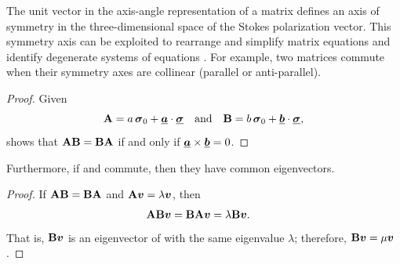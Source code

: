The unit vector in the axis-angle representation of a matrix defines an axis of symmetry in the three-dimensional space of the Stokes polarization vector.
%
This symmetry axis can be exploited to rearrange and simplify matrix equations and identify degenerate systems of equations \citep[as in Appendix B of][and  of this paper]{van04c}.
%
For example, two matrices 
commute when their symmetry axes are collinear (parallel or anti-parallel).
%
\begin{proof}
Given $${\bf A} = a\,\mbox{\boldmath $\sigma$}_{0} + \underline{\mbox{\boldmath $a$}} \cdot \underline{\mbox{\boldmath $\sigma$}} \quad\text{and}\quad
{\bf B} = b\,\mbox{\boldmath $\sigma$}_{0} + \underline{\mbox{\boldmath $b$}} \cdot \underline{\mbox{\boldmath $\sigma$}},$$
  shows that ${\bf A}{\bf B} = {\bf B}{\bf A}$ if and only if $\underline{\mbox{\boldmath $a$}} \times \underline{\mbox{\boldmath $b$}} = 0$.
\end{proof}
%

Furthermore, if  and  commute, then they have common eigenvectors.
\begin{proof}
\label{proof:common_eigenvalue}
If ${\bf A}{\bf B} = {\bf B}{\bf A}$ and ${\bf A}\mbox{\boldmath $v$} = \lambda \mbox{\boldmath $v$}$,
then
\begin{align*}
{\bf A}{\bf B}\mbox{\boldmath $v$} &= {\bf B}{\bf A}\mbox{\boldmath $v$} = \lambda {\bf B}\mbox{\boldmath $v$}.
\end{align*}
That is, ${\bf B}\mbox{\boldmath $v$}$ is an eigenvector of  with the same eigenvalue $\lambda$;
therefore, ${\bf B}\mbox{\boldmath $v$}=\mu\mbox{\boldmath $v$}$.
\end{proof}


